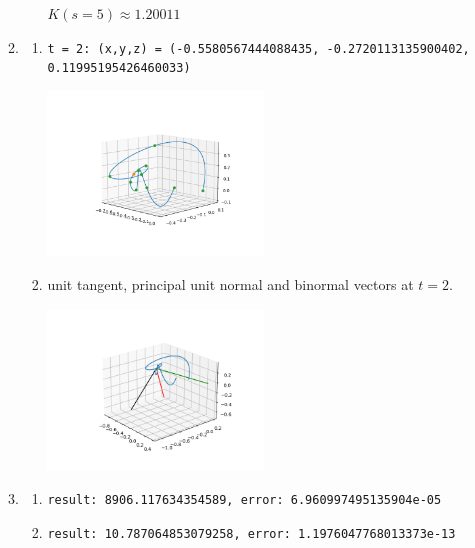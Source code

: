 \documentclass[11pt]{article}
\newcommand{\Newpage}{\end{preview}\begin{preview}}
\begin{document}
\begin{preview}
\begin{enumerate}
\begin{enumerate}
\begin{enumerate}
                          $K(s=5) \approx 1.20011$
                  \end{enumerate}
            \item
                  \begin{enumerate}
                    \item \texttt{t = 2: (x,y,z) = (-0.5580567444088435, -0.2720113135900402, 0.11995195426460033)}
                          \begin{center}
                            \includegraphics[width=0.5\textwidth]{inc/q4bi_0.png}
                          \end{center}
                    \item unit tangent, principal unit normal and binormal vectors at $t = 2$.
                          \begin{center}
                            \includegraphics[width=0.5\textwidth]{inc/q4bii.png}
                          \end{center}
                  \end{enumerate}
            \item
                  \begin{enumerate}
                    \item \texttt{result: 8906.117634354589, error: 6.960997495135904e-05}
                    \item \texttt{result: 10.787064853079258, error: 1.1976047768013373e-13}
                  \end{enumerate}
          \end{enumerate}
  \end{enumerate}

  \Newpage


\end{preview}
\end{document}
